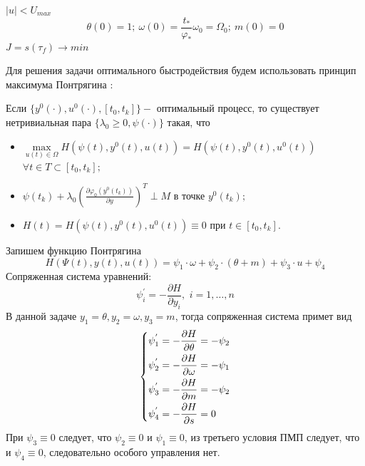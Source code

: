 \documentclass[a4paper,14pt]{article}
\theoremstyle{plain} %
\theoremstyle{definition} %
\theoremstyle{remark} %
\begin{document}
{$|u|<U_{max}$
\[
    \theta(0)=1;\ \omega(0)=\frac{t_\ast}{\varphi_\ast}\omega_0=\Omega_0;\ m(0)=0
\]
$J=s(\tau_f)\to min$

Для решения задачи оптимального быстродействия будем использовать принцип максимума Понтрягина \cite{Specpract}:

Если $\{y^0(\cdot),u^0(\cdot),[t_0,t_k]\} - $ оптимальный процесс, то существует нетривиальная пара $\{\lambda_0\geq0,\psi(\cdot)\}$
такая, что
\begin{itemize}
    \item $ \mathop {\max }\limits_{u(t) \in \Omega}  H(\psi(t),y^0(t),u(t))=H(\psi(t),y^0(t),u^0(t))$
          $\forall t \in T \subset [t_0,t_k];$
    \item $\psi(t_k)+\lambda_0(\frac{\partial \varphi_0(y^0(t_k))}{\partial y})^T \perp M \text{ в точке } y^0(t_k);$
    \item $H(t)=H(\psi(t),y^0(t),u^0(t))\equiv0 \text{ при } t \in [t_0,t_k].$
\end{itemize}
Запишем функцию Понтрягина
\[
    H(\Psi(t),y(t),u(t))=\psi_1\cdot\omega+\psi_2\cdot(\theta+m)+\psi_3\cdot u+\psi_4
\]
Сопряженная система уравнений:
\[
    \psi^{'}_i  =  - \frac{{\partial H}}{{\partial y_i }},\,\,i = 1, \ldots ,n
\]
В данной задаче $y_1 = \theta, y_2 = \omega, y_3=m$, тогда сопряженная система примет вид
\begin{equation} \label{7}
    \left\{ {\begin{aligned}
                 & \psi^{'}_1=  - \frac{{\partial H}}{{\partial \theta}} = - \psi_2\hfill  \\
                 & \psi^{'}_2=  - \frac{{\partial H}}{{\partial \omega }} = - \psi_1\hfill \\
                 & \psi^{'}_3=  - \frac{{\partial H}}{{\partial m }} = - \psi_2 \hfill     \\
                 & \psi^{'}_4=- \frac{{\partial H}}{{\partial s }}= 0 \hfill               \\
            \end{aligned}} \right.
\end{equation}
При $\psi_3\equiv0$ следует, что $\psi_2\equiv0$ и $\psi_1\equiv0$, из третьего условия ПМП следует, что и $\psi_4\equiv0$, следовательно особого управления нет.

}
\end{document}
